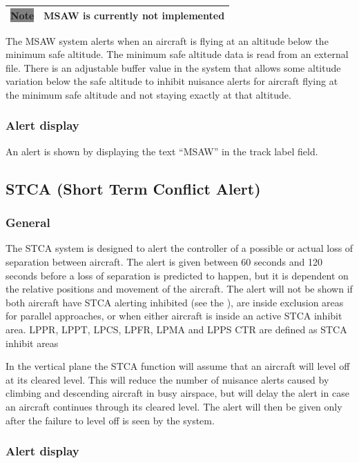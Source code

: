 \documentclass[a4paper,oneside,11pt]{memoir}
\newcommand{\tagref}[1]{\textit{\hyperref[#1]{\StrDel{#1}{tag:}}}}
\newcommand{\winref}[1]{\textit{\titleref{#1}}}
\newcommand{\note}[1]{
  \begin{center}
    
    \begin{tabular}{| P{1.5cm}|p{10.5cm} |}
      \hline
      \cellcolor{shadecolor}\colorbox{gray}{\color{white}Note} &\cellcolor{shadecolor} #1 \\ \hline
    \end{tabular}
  \end{center}
}
\begin{document}
\note{MSAW is currently not implemented}

The MSAW system alerts when an aircraft is flying at an altitude below the minimum safe altitude. The minimum safe altitude data is read from an external file. There is an adjustable buffer value in the system that allows some altitude variation below the safe altitude to inhibit nuisance alerts for aircraft flying at the minimum safe altitude and not staying exactly at that altitude.

\subsubsection*{Alert display}

An alert is shown by displaying the text “MSAW” in the \tagref{tag:ALRT} track label field.

\subsection{STCA (Short Term Conflict Alert)}
\label{tool:STCA}
\subsubsection*{General}

The STCA system is designed to alert the controller of a possible or actual loss of separation between aircraft. The alert is given between 60 seconds and 120 seconds before a loss of separation is predicted to happen, but it is dependent on the relative positions and movement of the aircraft. The alert will not be shown if both aircraft have STCA alerting inhibited (see the \winref{win:snsw}), are inside exclusion areas for parallel approaches, or when either aircraft is inside an active STCA inhibit area. LPPR, LPPT, LPCS, LPFR, LPMA and LPPS CTR are defined as STCA inhibit areas

\bigskip

In the vertical plane the STCA function will assume that an aircraft will level off at its cleared level. This will reduce the number of nuisance alerts caused by climbing and descending aircraft in busy airspace, but will delay the alert in case an aircraft continues through its cleared level. The alert will then be given only after the failure to level off is seen by the system.

\subsubsection*{Alert display}
\end{document}
